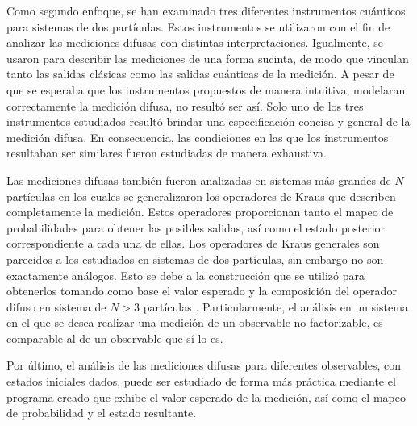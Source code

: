 
Como segundo enfoque, se han examinado tres diferentes instrumentos cuánticos
para sistemas de dos partículas. Estos instrumentos se utilizaron con el fin de
analizar las mediciones difusas con distintas interpretaciones.  Igualmente, se
usaron para describir las mediciones de una forma sucinta, de modo que vinculan
tanto las salidas clásicas como las salidas cuánticas de la medición. A pesar
de que se esperaba que los instrumentos propuestos de manera intuitiva,
modelaran correctamente la medición difusa, no resultó ser así. Solo uno de los
tres instrumentos estudiados resultó brindar una especificación concisa y
general de la medición difusa. En consecuencia, las condiciones en las que los
instrumentos resultaban ser similares fueron estudiadas de manera exhaustiva. 




Las mediciones difusas también fueron analizadas en sistemas más grandes de $N$
partículas en los cuales se generalizaron los operadores de Kraus que describen
completamente la medición. Estos operadores proporcionan tanto el mapeo de
probabilidades para obtener las posibles salidas, así como el estado posterior
correspondiente a cada una de ellas. Los operadores de Kraus generales son
parecidos a los estudiados en sistemas de dos partículas, sin embargo no son
exactamente análogos. Esto se debe a la construcción que se utilizó para
obtenerlos tomando como base el valor esperado y la composición del operador
difuso en sistema de $N>3$ partículas .
Particularmente, el análisis en un sistema en el que se desea realizar una
medición de un observable no factorizable, es comparable al de un observable
que sí lo es.


Por último, el análisis de las mediciones difusas para diferentes observables,
con estados iniciales dados, puede ser estudiado de forma más práctica mediante
el programa creado que exhibe el valor esperado de la medición, así como el
mapeo de probabilidad y el estado resultante.

